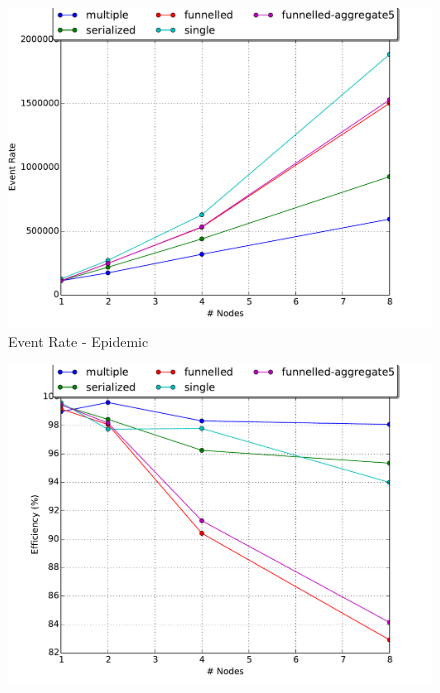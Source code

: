 \documentclass[11pt]{book}
\begin{document}
\begin{figure}
  \begin{minipage}{.5\textwidth}
    \begin{center}
      \includegraphics[width=\textwidth,keepaspectratio,quiet]{figs/partitioning_communication/communication_epidemic_eventrate.pdf} \\
      Event Rate - Epidemic \\
    \end{center}
  \end{minipage}%
  \hfill
  \begin{minipage}{.5\textwidth}
    \begin{center}
      \includegraphics[width=\textwidth,keepaspectratio,quiet]{figs/partitioning_communication/communication_epidemic_efficiency.pdf} \\

\end{center}
\end{minipage}
\end{figure}
\end{document}
